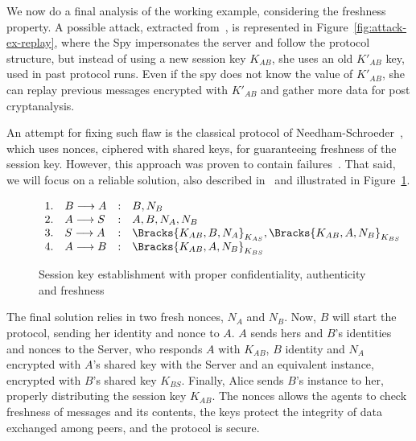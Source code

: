 We now do a final analysis of the working example, considering the freshness property. A possible attack, extracted from~\cite{BoydMathuria2008}, is represented in Figure~\ref{fig:attack-ex-replay}, where the Spy impersonates the server and follow the protocol structure, but instead of using a new session key \(K_{AB}\), she uses an old \(K'_{AB}\) key, used in past protocol runs. Even if the spy does not know the value of \(K'_{AB}\), she can replay previous messages encrypted with \(K'_{AB}\) and gather more data for post cryptanalysis.

An attempt for fixing such flaw is the classical protocol of Needham-Schroeder~\cite{NeedhamSchroeder78}, which uses nonces, ciphered with shared keys, for guaranteeing freshness of the session key. However, this approach was proven to contain failures~\cite{Lowe96}. That said, we will focus on a reliable solution, also described in~\cite{BoydMathuria2008} and illustrated in Figure~\ref{prt:session-key-complete}.

\begin{figure}[ht]\label{prt:session-key-complete}
  \centering
  \[
    \begin{array}{rlcl}
      1. & B \longrightarrow A &:& B, N_B \\
      2. & A \longrightarrow S &:& A, B, N_A, N_B \\
      3. & S \longrightarrow A &:& \Bracks{K_{AB}, B, N_A}_{K_{AS}}, \Bracks{K_{AB}, A, N_B}_{K_{BS}} \\
      4. & A \longrightarrow B &:& \Bracks{K_{AB}, A, N_B}_{K_{BS}} \\
    \end{array}
  \]
  \caption{Session key establishment with proper confidentiality, authenticity and freshness}
\end{figure}

The final solution relies in two fresh nonces, \(N_A\) and \(N_B\). Now, \(B\) will start the protocol, sending her identity and nonce to \(A\). \(A\) sends hers and \(B\)'s identities and nonces to the Server, who responds \(A\) with \(K_{AB}\), \(B\) identity and \(N_A\) encrypted with \(A\)'s shared key with the Server and an equivalent instance, encrypted with \(B\)'s shared key \(K_{BS}\). Finally, Alice sends \(B\)'s instance to her, properly distributing the session key \(K_{AB}\). The nonces allows the agents to check freshness of messages and its contents, the keys protect the integrity of data exchanged among peers, and the protocol is secure.





